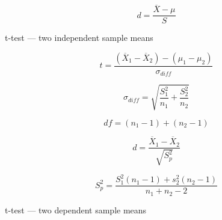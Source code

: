 \documentclass[12pt]{article}
\begin{document}
\begin{equation}
	d = \frac{\overline{X}-{\mu}}{S}
\end{equation}

t-test --- two independent sample means

\begin{equation}
	t = \frac{({\overline{X}_1} - {\overline{X}_2}) - ({\mu}_1 - {\mu}_2)}{{\sigma}_{diff}} 
\end{equation}

\begin{equation}
	\sigma_{diff} = \sqrt{{\frac{S_1^2}{n_1}} + {\frac{S_2^2}{n_2}}} 
\end{equation}

\begin{equation}
	df = (n_1 - 1) + (n_2 - 1) 
\end{equation}

\begin{equation}
	d = \frac{{\overline{X}_1}-{\overline{X}_2}}{\sqrt{S_p^2}} 
\end{equation}

\begin{equation}
	S_p^2 = \frac{S_1^2 (n_1 - 1) + s_2^2 (n_2 - 1)}{n_1 + n_2 - 2} 
\end{equation}

t-test --- two dependent sample means
\end{document}
